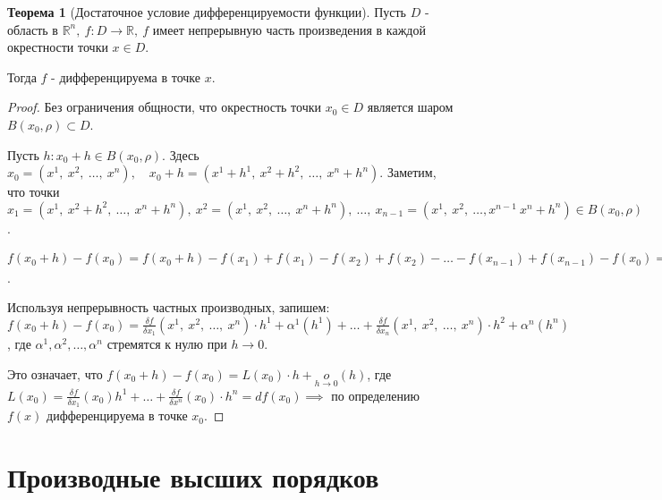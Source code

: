 \documentclass{report}
\theoremstyle{definition}
\newtheorem{theorem}{Теорема}[section]
\begin{document}
\begin{theorem}[Достаточное условие дифференцируемости функции]
  Пусть $D$ - область в $\mathbb{R}^n, \ f:D\rightarrow\mathbb{R}, \ f$ имеет непрерывную часть произведения в каждой окрестности точки $x \in D$.

  Тогда $f$ - дифференцируема в точке $x$.
\end{theorem}

\begin{proof}
  Без ограничения общности, что окрестность точки $x_0 \in D$ является шаром $B(x_0,\rho)\subset D$.

  Пусть $h:x_0 + h \in B(x_0,\rho)$. Здесь $x_0 = (x^1, \ x^2, \ \ldots, \ x^n), \quad x_0 + h = (x^1 + h^1, \ x^2 + h^2, \ \ldots, \ x^n + h^n)$. Заметим, что точки $x_1 = (x^1, \ x^2 + h^2, \ \ldots, \ x^n + h^n), \ x^2 = (x^1, \ x^2, \ \ldots, \ x^n + h^n), \ \ldots, \ x_{n-1} = (x^1, \ x^2, \ \ldots, x^{n-1} \ x^n + h^n) \in B(x_0,\rho)$.

  $f(x_0 + h) - f(x_0) = f(x_0 + h) - f(x_1) + f(x_1) - f(x_2) + f(x_2) - \ldots - f(x_{n-1}) + f(x_{n-1}) - f(x_0) = f(x^1 + h^1, \ \ldots, \ x^n + h^n) - f(x^1, \ x^2 + h^2, \ \ldots, \ x^n + h^n) + f(x^1, \ x^2 + h^2, \ \ldots, \ x^n + h^n) - f(x^1, \ x^2, \ \ldots, \ x^n + h^n) + f(x^1, \ x^2, \ \ldots, \ x^n + h^n) - \ldots - f(x^1, \ x^2, \ \ldots, \ x^{n-1}, \ x^n) + f(x^1, \ x^2, \ \ldots, \ x^{n-1}, \ x^n + h^n) - f(x^1, \ x^2, \ \ldots, \ x^n) = \left| Lagranj \ theorem \ for \ 1 \ variable \right| = \frac{\delta f}{\delta x_1}(x^1 + \theta^1 h^1, \ x^2 + h^2, \ \ldots, \ x^n + h^n) \cdot h^1 + \frac{\delta f}{\delta x^2}(x^1, \ x^2 + \theta^2 h^2, \ \ldots, \ x^n + h^n) \cdot h^2 + \ldots + \frac{\delta f}{\delta x^n}(x^1, \ x^2, \ \ldots, \ x^n + \theta^n h^n) \cdot h^n$.

  Используя непрерывность частных производных, запишем: $f(x_0 + h) - f(x_0) = \frac{\delta f}{\delta x_1}(x^1, \ x^2, \ \ldots, \ x^n) \cdot h^1 + \alpha^1(h^1) + \ldots + \frac{\delta f}{\delta x_n}(x^1, \ x^2, \ \ldots, \ x^n) \cdot h^2 + \alpha^n(h^n)$, где $\alpha^1,\alpha^2,\ldots,\alpha^n$ стремятся к нулю при $h\rightarrow0$.

  Это означает, что $f(x_0 + h) - f(x_0) = L(x_0)\cdot h + \underset{h\rightarrow0}{o}(h)$, где $L(x_0) = \frac{\delta f}{\delta x_1}(x_0)h^1 + \ldots + \frac{\delta f}{\delta x^n}(x_0) \cdot h^n = df(x_0) \implies$ по определению $f(x)$ дифференцируема в точке $x_0$.
\end{proof}

\section{Производные высших порядков}
\end{document}
